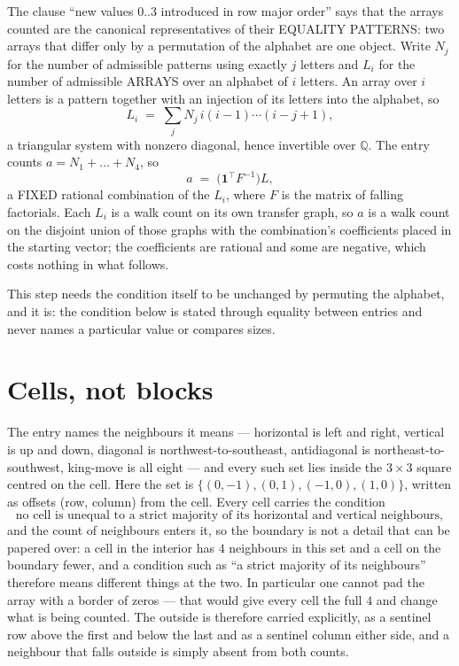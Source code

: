 \documentclass[11pt,a4paper]{article}
\theoremstyle{plain}
\theoremstyle{definition}
\begin{document}
The clause ``new values $0..3$ introduced in row major order'' says that the arrays
counted are the canonical representatives of their EQUALITY PATTERNS: two arrays that differ
only by a permutation of the alphabet are one object. Write $N_j$ for the number of admissible
patterns using exactly $j$ letters and $L_i$ for the number of admissible ARRAYS over an
alphabet of $i$ letters. An array over $i$ letters is a pattern together with an injection of
its letters into the alphabet, so
\[
L_i\;=\;\sum_{j}N_j\,i(i-1)\cdots(i-j+1),
\]
a triangular system with nonzero diagonal, hence invertible over $\mathbb{Q}$. The entry
counts $a=N_1+\dots+N_{4}$, so
\[
a\;=\;\bigl(\mathbf{1}^{\!\top}F^{-1}\bigr)L ,
\]
a FIXED rational combination of the $L_i$, where $F$ is the matrix of falling factorials.
Each $L_i$ is a walk count on its own transfer graph, so $a$ is a walk count on the disjoint
union of those graphs with the combination's coefficients placed in the starting vector; the
coefficients are rational and some are negative, which costs nothing in what follows.

This step needs the condition itself to be unchanged by permuting the alphabet, and it is:
the condition below is stated through equality between entries and never names a particular
value or compares sizes.

\section{Cells, not blocks}

The entry names the neighbours it means --- horizontal is left and right, vertical is up and
down, diagonal is northwest-to-southeast, antidiagonal is northeast-to-southwest, king-move is
all eight --- and every such set lies inside the $3\times3$ square centred on the cell. Here
the set is $\{(0,-1), (0,1), (-1,0), (1,0)\}$, written as offsets (row, column) from the cell. Every cell carries
the condition
\[
\text{no cell is unequal to a strict majority of its horizontal and vertical neighbours},
\]
and the count of neighbours enters it, so the boundary is not a detail that can be papered
over: a cell in the interior has $4$ neighbours in this set and a cell on the boundary
fewer, and a condition such as ``a strict majority of its neighbours'' therefore means
different things at the two. In particular one cannot pad the array with a border of zeros ---
that would give every cell the full $4$ and change what is being counted. The outside is
therefore carried
explicitly, as a sentinel row above the first and below the last and as a sentinel column
either side, and a neighbour that falls outside is simply absent from both counts.
\end{document}

